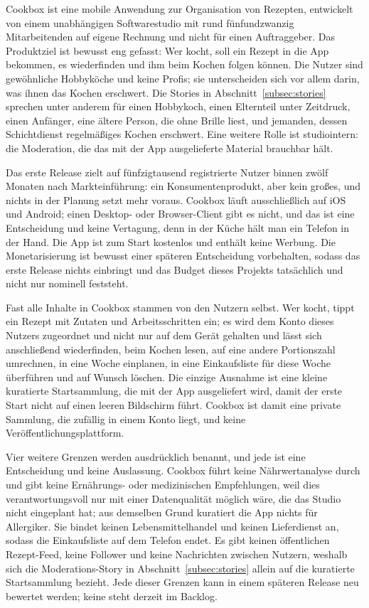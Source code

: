 Cookbox ist eine mobile Anwendung zur Organisation von Rezepten, entwickelt von einem unabhängigen Softwarestudio mit rund fünfundzwanzig Mitarbeitenden auf eigene Rechnung und nicht für einen Auftraggeber. Das Produktziel ist bewusst eng gefasst: Wer kocht, soll ein Rezept in die App bekommen, es wiederfinden und ihm beim Kochen folgen können. Die Nutzer sind gewöhnliche Hobbyköche und keine Profis; sie unterscheiden sich vor allem darin, was ihnen das Kochen erschwert. Die Stories in Abschnitt~\ref{subsec:stories} sprechen unter anderem für einen Hobbykoch, einen Elternteil unter Zeitdruck, einen Anfänger, eine ältere Person, die ohne Brille liest, und jemanden, dessen Schichtdienst regelmäßiges Kochen erschwert. Eine weitere Rolle ist studiointern: die Moderation, die das mit der App ausgelieferte Material brauchbar hält.

Das erste Release zielt auf fünfzigtausend registrierte Nutzer binnen zwölf Monaten nach Markteinführung: ein Konsumentenprodukt, aber kein großes, und nichts in der Planung setzt mehr voraus. Cookbox läuft ausschließlich auf iOS und Android; einen Desktop- oder Browser-Client gibt es nicht, und das ist eine Entscheidung und keine Vertagung, denn in der Küche hält man ein Telefon in der Hand. Die App ist zum Start kostenlos und enthält keine Werbung. Die Monetarisierung ist bewusst einer späteren Entscheidung vorbehalten, sodass das erste Release nichts einbringt und das Budget dieses Projekts tatsächlich und nicht nur nominell feststeht.

Fast alle Inhalte in Cookbox stammen von den Nutzern selbst. Wer kocht, tippt ein Rezept mit Zutaten und Arbeitsschritten ein; es wird dem Konto dieses Nutzers zugeordnet und nicht nur auf dem Gerät gehalten und lässt sich anschließend wiederfinden, beim Kochen lesen, auf eine andere Portionszahl umrechnen, in eine Woche einplanen, in eine Einkaufsliste für diese Woche überführen und auf Wunsch löschen. Die einzige Ausnahme ist eine kleine kuratierte Startsammlung, die mit der App ausgeliefert wird, damit der erste Start nicht auf einen leeren Bildschirm führt. Cookbox ist damit eine private Sammlung, die zufällig in einem Konto liegt, und keine Veröffentlichungsplattform.

Vier weitere Grenzen werden ausdrücklich benannt, und jede ist eine Entscheidung und keine Auslassung. Cookbox führt keine Nährwertanalyse durch und gibt keine Ernährungs- oder medizinischen Empfehlungen, weil dies verantwortungsvoll nur mit einer Datenqualität möglich wäre, die das Studio nicht eingeplant hat; aus demselben Grund kuratiert die App nichts für Allergiker. Sie bindet keinen Lebensmittelhandel und keinen Lieferdienst an, sodass die Einkaufsliste auf dem Telefon endet. Es gibt keinen öffentlichen Rezept-Feed, keine Follower und keine Nachrichten zwischen Nutzern, weshalb sich die Moderations-Story in Abschnitt~\ref{subsec:stories} allein auf die kuratierte Startsammlung bezieht. Jede dieser Grenzen kann in einem späteren Release neu bewertet werden; keine steht derzeit im Backlog.


